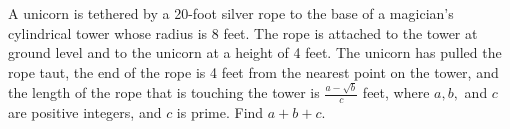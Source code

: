 A unicorn is tethered by a 20-foot silver rope to the base of a magician's cylindrical tower whose radius is 8 feet. The rope is attached to the tower at ground level and to the unicorn at a height of 4 feet. The unicorn has pulled the rope taut, the end of the rope is 4 feet from the nearest point on the tower, and the length of the rope that is touching the tower is $\frac{a-\sqrt{b}}c$ feet, where $a, b,$ and $c$ are positive integers, and $c$ is prime. Find $a+b+c$.